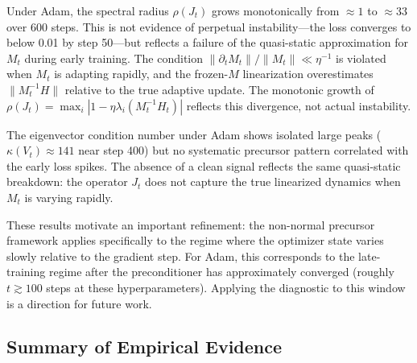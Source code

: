 \documentclass[aps,prresearch,twocolumn,superscriptaddress,longbibliography]{revtex4-2}
\begin{document}
Under Adam, the spectral radius $\rho(J_t)$ grows monotonically from
$\approx 1$ to $\approx 33$ over 600 steps.
This is not evidence of perpetual instability---the loss converges to
below 0.01 by step 50---but reflects a failure of the quasi-static
approximation for $M_t$ during early training.
The condition $\|\partial_t M_t\|/\|M_t\|\ll\eta^{-1}$ is violated when
$M_t$ is adapting rapidly, and the frozen-$M$ linearization
overestimates $\|M_t^{-1}H\|$ relative to the true adaptive update.
The monotonic growth of
$\rho(J_t) = \max_i|1-\eta\lambda_i(M_t^{-1}H_t)|$
reflects this divergence, not actual instability.

The eigenvector condition number under Adam shows isolated large peaks
($\kappa(V_t)\approx 141$ near step 400) but no systematic precursor
pattern correlated with the early loss spikes.
The absence of a clean signal reflects the same quasi-static breakdown:
the operator $J_t$ does not capture the true linearized dynamics when
$M_t$ is varying rapidly.

These results motivate an important refinement: the non-normal precursor
framework applies specifically to the regime where the optimizer state
varies slowly relative to the gradient step.
For Adam, this corresponds to the late-training regime after the
preconditioner has approximately converged (roughly $t\gtrsim 100$
steps at these hyperparameters).
Applying the diagnostic to this window is a direction for future work.

\subsection{Summary of Empirical Evidence}
\end{document}
